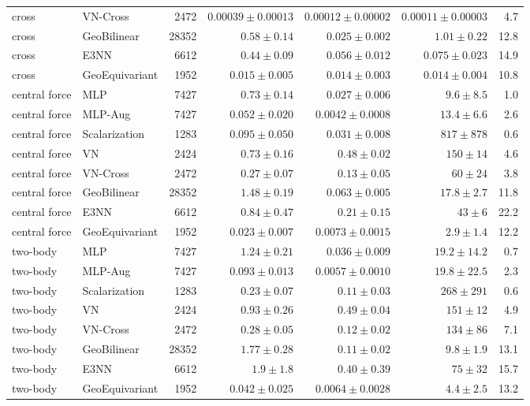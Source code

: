 \documentclass[11pt]{article}
\begin{document}
\begin{table}[t]
\begin{tabular}{llrrrrr}
cross & VN-Cross & 2472 & $0.00039 \pm 0.00013$ & $0.00012 \pm 0.00002$ & $0.00011 \pm 0.00003$ & 4.7 \\
cross & GeoBilinear & 28352 & $0.58 \pm 0.14$ & $0.025 \pm 0.002$ & $1.01 \pm 0.22$ & 12.8 \\
cross & E3NN & 6612 & $0.44 \pm 0.09$ & $0.056 \pm 0.012$ & $0.075 \pm 0.023$ & 14.9 \\
cross & GeoEquivariant & 1952 & $0.015 \pm 0.005$ & $0.014 \pm 0.003$ & $0.014 \pm 0.004$ & 10.8 \\
\midrule
central force & MLP & 7427 & $0.73 \pm 0.14$ & $0.027 \pm 0.006$ & $9.6 \pm 8.5$ & 1.0 \\
central force & MLP-Aug & 7427 & $0.052 \pm 0.020$ & $0.0042 \pm 0.0008$ & $13.4 \pm 6.6$ & 2.6 \\
central force & Scalarization & 1283 & $0.095 \pm 0.050$ & $0.031 \pm 0.008$ & $817 \pm 878$ & 0.6 \\
central force & VN & 2424 & $0.73 \pm 0.16$ & $0.48 \pm 0.02$ & $150 \pm 14$ & 4.6 \\
central force & VN-Cross & 2472 & $0.27 \pm 0.07$ & $0.13 \pm 0.05$ & $60 \pm 24$ & 3.8 \\
central force & GeoBilinear & 28352 & $1.48 \pm 0.19$ & $0.063 \pm 0.005$ & $17.8 \pm 2.7$ & 11.8 \\
central force & E3NN & 6612 & $0.84 \pm 0.47$ & $0.21 \pm 0.15$ & $43 \pm 6$ & 22.2 \\
central force & GeoEquivariant & 1952 & $0.023 \pm 0.007$ & $0.0073 \pm 0.0015$ & $2.9 \pm 1.4$ & 12.2 \\
\midrule
two-body & MLP & 7427 & $1.24 \pm 0.21$ & $0.036 \pm 0.009$ & $19.2 \pm 14.2$ & 0.7 \\
two-body & MLP-Aug & 7427 & $0.093 \pm 0.013$ & $0.0057 \pm 0.0010$ & $19.8 \pm 22.5$ & 2.3 \\
two-body & Scalarization & 1283 & $0.23 \pm 0.07$ & $0.11 \pm 0.03$ & $268 \pm 291$ & 0.6 \\
two-body & VN & 2424 & $0.93 \pm 0.26$ & $0.49 \pm 0.04$ & $151 \pm 12$ & 4.9 \\
two-body & VN-Cross & 2472 & $0.28 \pm 0.05$ & $0.12 \pm 0.02$ & $134 \pm 86$ & 7.1 \\
two-body & GeoBilinear & 28352 & $1.77 \pm 0.28$ & $0.11 \pm 0.02$ & $9.8 \pm 1.9$ & 13.1 \\
two-body & E3NN & 6612 & $1.9 \pm 1.8$ & $0.40 \pm 0.39$ & $75 \pm 32$ & 15.7 \\
two-body & GeoEquivariant & 1952 & $0.042 \pm 0.025$ & $0.0064 \pm 0.0028$ & $4.4 \pm 2.5$ & 13.2 \\
\bottomrule
\end{tabular}
\end{table}
\end{document}
